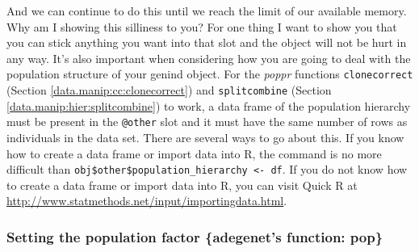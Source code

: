\documentclass[letterpaper]{article}
\begin{document}
\begin{center}
\end{center}

And we can continue to do this until we reach the limit of our available memory. Why am I showing this silliness to you? For one thing I want to show you that you can stick anything you want into that slot and the object will not be hurt in any way. It's also important when considering how you are going to deal with the population structure of your genind object. For the \textit{poppr} functions \texttt{clonecorrect} (Section \ref{data.manip:cc:clonecorrect}) and \texttt{splitcombine} (Section \ref{data.manip:hier:splitcombine}) to work, a data frame of the population hierarchy must be present in the \texttt{@other} slot and it must have the same number of rows as individuals in the data set. There are several ways to go about this. If you know how to create a data frame or import data into R, the command is no more difficult than \texttt{obj\$other\$population\_hierarchy <- df}. If you do not know how to create a data frame or import data into R, you can visit Quick R at \url{http://www.statmethods.net/input/importingdata.html}.
\subsubsection{Setting the population factor \{adegenet's function: pop\}}\label{intro:genind:pop}
\end{document}
